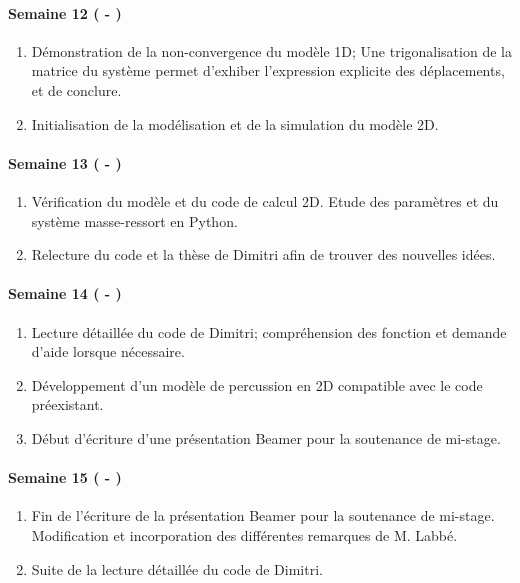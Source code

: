 \paragraph{Semaine 12 ( - )} 
\begin{enumerate}
    \item Démonstration de la non-convergence du modèle 1D; 
    Une trigonalisation de la matrice du système permet d'exhiber l'expression explicite des déplacements, et de conclure.
    \item Initialisation de la modélisation et de la simulation du modèle 2D.
  \end{enumerate}
  
\paragraph{Semaine 13 ( - )} 
\begin{enumerate}
    \item Vérification du modèle et du code de calcul 2D. Etude des paramètres et du système masse-ressort en Python.
    \item Relecture du code et la thèse de Dimitri afin de trouver des nouvelles idées.
\end{enumerate}


\paragraph{Semaine 14 ( - )} 
\begin{enumerate}
    \item Lecture détaillée du code de Dimitri; compréhension des fonction et demande d'aide lorsque nécessaire.
    \item Développement d'un modèle de percussion en 2D compatible avec le code préexistant.
    \item Début d'écriture d'une présentation Beamer pour la soutenance de mi-stage.
\end{enumerate}
  

\paragraph{Semaine 15 ( - )} 
\begin{enumerate}
    \item Fin de l'écriture de la présentation Beamer pour la soutenance de mi-stage. Modification et incorporation des différentes remarques de M. Labbé. 
    \item Suite de la lecture détaillée du code de Dimitri.
  \end{enumerate}


